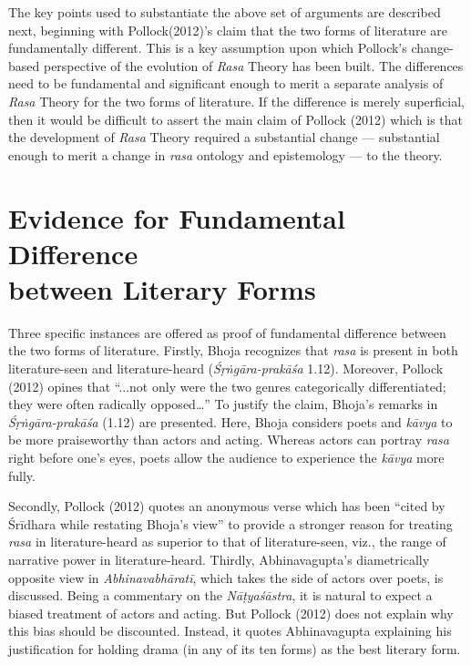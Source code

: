 The key points used to substantiate the above set of arguments are described next, beginning with Pollock(2012)’s claim that the two forms of literature are fundamentally different. This is a key assumption upon which Pollock’s change-based perspective of the evolution of \textsl{Rasa} Theory has been built. The differences need to be fundamental and significant enough to merit a separate analysis of \textsl{Rasa} Theory for the two forms of literature. If the difference is merely superficial, then it would be difficult to assert the main claim of Pollock (2012) which is that the development of \textsl{Rasa} Theory required a substantial change --- substantial enough to merit a change in \textsl{rasa }ontology and epistemology --- to the theory. 

\section*{Evidence for Fundamental Difference\\ between Literary Forms}

Three specific instances are offered as proof of fundamental difference between the two forms of literature. Firstly, Bhoja recognizes that \textsl{rasa} is present in both literature-seen and literature-heard (\textsl{Śṛṅgāra-prakāśa} 1.12). Moreover, Pollock (2012) opines that “...not only were the two genres categorically differentiated; they were often radically opposed…” To justify the claim, Bhoja’s remarks in \textsl{Śṛṅgāra-prakāśa} (1.12) are presented. Here, Bhoja considers poets and \textsl{kāvya }to be more praiseworthy than actors and acting. Whereas actors can portray \textsl{rasa} right before one’s eyes, poets allow the audience to experience the \textsl{kāvya }more fully. 

Secondly, Pollock (2012) quotes an anonymous verse which has been “cited by Śrīdhara while restating Bhoja’s view” to provide a stronger reason for treating \textsl{rasa} in literature-heard as superior to that of literature-seen, viz., the range of narrative power in literature-heard. 
Thirdly, Abhinavagupta’s diametrically opposite view in \textsl{Abhinavabhāratī}, which takes the side of actors over poets, is discussed. Being a commentary on the \textsl{Nāṭyaśāstra}, it is natural to expect a biased treatment of actors and acting. But Pollock (2012) does not explain why this bias should be discounted. Instead, it quotes Abhinavagupta explaining his justification for holding drama (in any of its ten forms) as the best literary form. 

